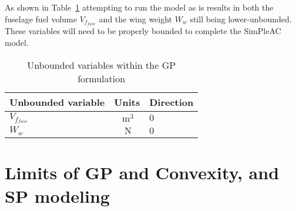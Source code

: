 
As shown in Table~\ref{t:WLTD_unbounded} attempting to run the model as is
results in both the fuselage fuel
volume $V_{f_{fuse}}$ and the wing weight $W_w$ still being lower-unbounded.
These variables will need to be properly bounded to complete the SimPleAC model.

\begin{footnotesize}
    \begin{center}
        \begin{table}
            \begin{tabular}{ l c l }
                \toprule
                Unbounded variable & Units & Direction \\
                \midrule
                $V_{f_{fuse}}$ &  $~\mathrm{m^3}$  & $0$ \\
                $W_w$ & $~\mathrm{N}$  & $0$ \\
                \bottomrule
            \end{tabular}
            \caption{Unbounded variables within the GP formulation}
            \label{t:WLTD_unbounded}
        \end{table}
    \end{center}
\end{footnotesize}

\section{Limits of GP and Convexity, and SP modeling}
\label{s:GPlimits}

